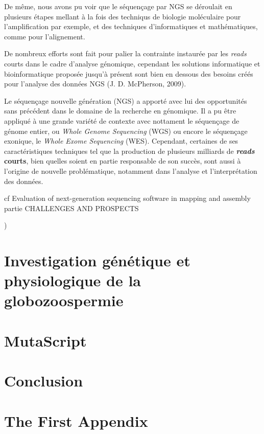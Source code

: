 \documentclass[12pt,twoside]{reedthesis}
\theoremstyle{definition}
\theoremstyle{definition}
\theoremstyle{remark}
\begin{document}
  De même, nous avons pu voir que le séquençage par NGS se déroulait en
  plusieurs étapes mellant à la fois des techniqus de biologie moléculaire
  pour l'amplification par exemple, et des techniques d'informatiques et
  mathématiques, comme pour l'alignement.
  
  De nombreux efforts sont fait pour palier la contrainte instaurée par
  les \emph{reads} courts dans le cadre d'analyse génomique, cependant les
  solutions informatique et bioinformatique proposée jusqu'à présent sont
  bien en dessous des besoins créés pour l'analyse des données NGS (J. D.
  McPherson, 2009).
  
  Le séquençage nouvelle génération (NGS) a apporté avec lui des
  opportunités sans précédent dans le domaine de la recherche en
  génomique. Il a pu être appliqué à une grande variété de contexte avec
  nottament le séquençage de génome entier, ou \emph{Whole Genome
  Sequencing} (WGS) ou encore le séquençage exonique, le \emph{Whole Exome
  Sequencing} (WES). Cependant, certaines de ses caractéristiques
  techniques tel que la production de plusieurs milliards de
  \textbf{\emph{reads} courts}, bien quelles soient en partie responsable
  de son succès, sont aussi à l'origine de nouvelle problématique,
  notamment dans l'analyse et l'interprétation des données.
  
  cf Evaluation of next-generation sequencing software in mapping and
  assembly partie CHALLENGES AND PROSPECTS
  
  )
  
  \chapter{Investigation génétique et physiologique de la
  globozoospermie}\label{globo}
  
  \chapter{MutaScript}\label{mutascript}
  
  \chapter*{Conclusion}\label{conclusion}
  
  \appendix
  
  \chapter{The First Appendix}\label{the-first-appendix}
  
\end{document}
